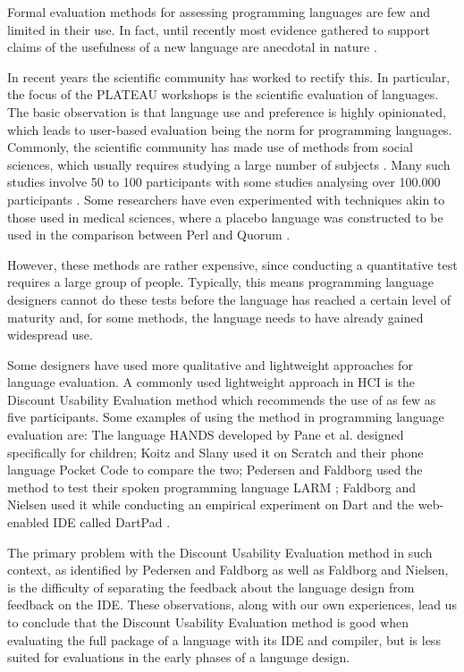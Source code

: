 \documentclass[10pt]{sigplanconf}
\begin{document}
Formal evaluation methods for assessing programming languages are few and limited in their use. In fact, until recently most evidence gathered to support claims of the usefulness of a new language are anecdotal in nature \cite{StakingClaims}. 

In recent years the scientific community has worked to rectify this.
In particular, the focus of the PLATEAU workshops is the scientific evaluation of languages.
The basic observation is that language use and preference is highly opinionated, which leads to user-based evaluation being the norm for programming languages.
Commonly, the scientific community has made use of methods from social sciences, which usually requires studying a large number of subjects \cite{SocioPLT}\cite{AliceCS1}\cite{BlockOrNot}\cite{FromScratch}.
Many such studies involve 50 to 100 participants \cite{hanenberg2010experiment}\cite{EmpStudiesonStimuli} with some studies analysing over 100.000 participants \cite{brown2014investigating}.
Some researchers have even experimented with techniques akin to those used in medical sciences, where a placebo language was constructed to be used in the comparison between Perl and Quorum \cite{stefik2011empirical}.

However, these methods are rather expensive, since conducting a quantitative test requires a large group of people. Typically, this means programming language designers cannot do these tests before the language has reached a certain level of maturity and, for some methods, the language needs to have already gained widespread use. 

Some designers have used more qualitative and lightweight approaches for language evaluation. A commonly used lightweight approach in HCI is the Discount Usability Evaluation method \cite{CooperativeEval} which recommends the use of as few as five participants. Some examples of using the method in programming language evaluation are: The language HANDS developed by Pane et al. \cite{HANDS} designed specifically for children; Koitz and Slany \cite{PocketCode} used it on Scratch and their phone language Pocket Code to compare the two; Pedersen and Faldborg used the method to test their spoken programming language LARM \cite{LARM}; Faldborg and Nielsen used it while conducting an empirical experiment on Dart and the web-enabled IDE called DartPad \cite{DART}.

The primary problem with the Discount Usability Evaluation method in such context, as identified by Pedersen and Faldborg as well as Faldborg and Nielsen, is the difficulty of separating the feedback about the language design from feedback on the IDE.
These observations, along with our own experiences, lead us to conclude that the Discount Usability Evaluation method is good when evaluating the full package of a language with its IDE and compiler, but is less suited for evaluations in the early phases of a language design.
\end{document}
